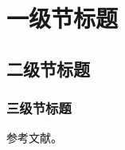 
\section{一级节标题}

\subsection{二级节标题}

\subsubsection{三级节标题}

参考文献\cite{example2025}。

\printbibliography[title=参考文献]